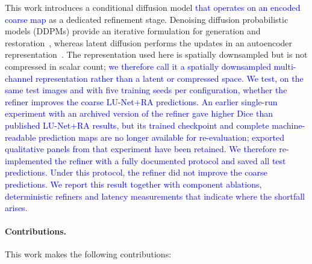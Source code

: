 \documentclass[jimaging,article,submit,pdftex,moreauthors]
  {Definitions/mdpi}
\DeclareRobustCommand{\rev}[1]{\textcolor{blue}{#1}}
\DeclareRobustCommand{\rev}[1]{#1}
\providecommand{\linelabel}[1]{}
\begin{document}
This work introduces a conditional diffusion model \rev{that operates on an encoded coarse map} as a dedicated refinement stage. Denoising diffusion probabilistic models (DDPMs) provide an iterative formulation for generation and restoration~\cite{Ho2020,Dhariwal2021}, whereas latent diffusion performs the updates in an autoencoder representation~\cite{Rombach2022}. The representation used here is spatially downsampled but is not compressed in scalar count; \rev{we therefore call it a spatially downsampled multi-channel representation rather than a latent or compressed space. We test, on the same test images and with five training seeds per configuration, whether the refiner improves the coarse LU-Net+RA predictions. An earlier single-run experiment with an archived version of the refiner gave higher Dice than published LU-Net+RA results, but its trained checkpoint and complete machine-readable prediction maps are no longer available for re-evaluation; exported qualitative panels from that experiment have been retained. We therefore re-implemented the refiner with a fully documented protocol and saved all test predictions. Under this protocol, the refiner did not improve the coarse predictions. We report this result together with component ablations, deterministic refiners and latency measurements that indicate where the shortfall arises.}\linelabel{rev:intro:representation}

\paragraph{Contributions.}
This work makes the following contributions:
\end{document}
